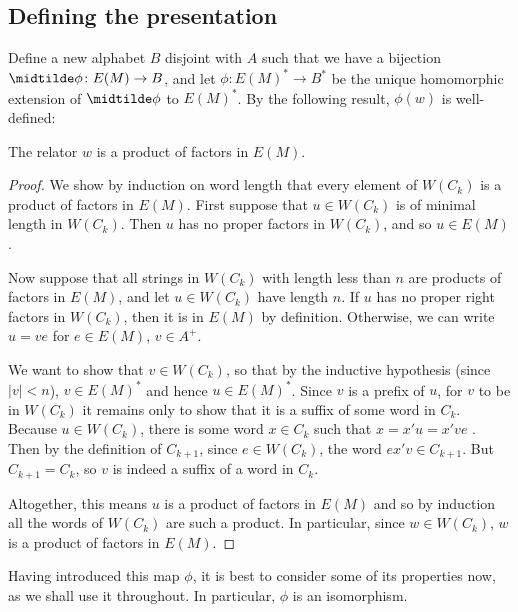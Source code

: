 \documentclass[noindex,noinsetproof,12pt]{lmaths}
\begin{document}
\subsection{Defining the presentation} \label{sec:defining-presentation}

Define a new alphabet $B$ disjoint with $A$ such that we have a bijection $\midtilde\phi \colon E(M) \to B$, and let $\phi \colon E(M)^* \to B^*$ be the unique homomorphic extension of $\midtilde\phi$ to $E(M)^*$. By the following result, $\phi(w)$ is well-defined:

\begin{prop} \label{lma:relator-factors-E(M)}
	The relator $w$ is a product of factors in $E(M)$.
\end{prop}
\begin{proof}
	\hspace{-0.25mm}We show by induction on word length that every element of $W(C_k)$ is a product of factors in $E(M)$. First suppose that $u \in W(C_k)$ is of minimal length in $W(C_k)$. Then $u$ has no proper factors in $W(C_k)$, and so $u \in E(M)$.

	Now suppose that all strings in $W(C_k)$ with length less than $n$ are products of factors in $E(M)$, and let $u \in W(C_k)$ have length $n$. If $u$ has no proper right factors in $W(C_k)$, then it is in $E(M)$ by definition. Otherwise, we can write $u = ve$ for $e \in E(M)$, $v \in A^+$.

	We want to show that $v \in W(C_k)$, so that by the inductive hypothesis (since $|v| < n$), $v \in E(M)^*$ and hence $u \in E(M)^*$. Since $v$ is a prefix of $u$, for $v$ to be in $W(C_k)$ it remains only to show that it is a suffix of some word in $C_k$. Because $u \in W(C_k)$, there is some word $x \in C_k$ such that $x = x'u = x've$ . Then by the definition of $C_{k+1}$, since $e \in W(C_k)$, the word $ex'v \in C_{k+1}$. But $C_{k+1} = C_k$, so $v$ is indeed a suffix of a word in $C_k$.

	Altogether, this means $u$ is a product of factors in $E(M)$ and so by induction all the words of $W(C_k)$ are such a product. In particular, since $w \in W(C_k)$, $w$ is a product of factors in $E(M)$.
\end{proof}

Having introduced this map $\phi$, it is best to consider some of its properties now, as we shall use it throughout. In particular, $\phi$ is an isomorphism.
\end{document}

